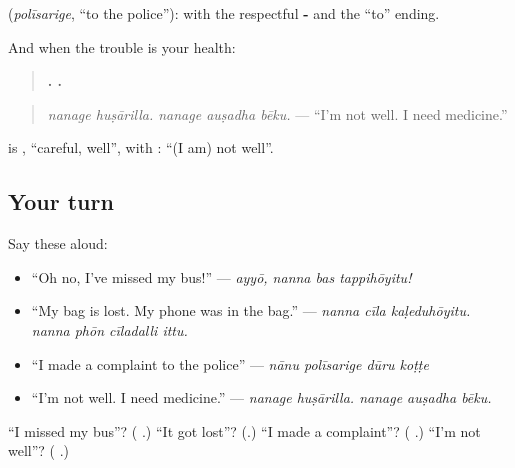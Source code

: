 \textbf{} (\emph{polīsarige}, \textquotedblleft{}to the police\textquotedblright{}): \textbf{} with the respectful \textbf{-} and the \textquotedblleft{}to\textquotedblright{} ending.

And when the trouble is your health:

\begin{quote}
\textbf{ .   .}
\end{quote}

\begin{quote}
\emph{nanage huṣārilla. nanage auṣadha bēku.} — \textquotedblleft{}I'm not well. I need medicine.\textquotedblright{}
\end{quote}

\textbf{} is \textbf{}, \textquotedblleft{}careful, well\textquotedblright{}, with \textbf{}: \textquotedblleft{}(I am) not well\textquotedblright{}.

\subsection*{Your turn}
Say these aloud:

\begin{itemize}
\raggedright
  \item \textquotedblleft{}Oh no, I've missed my bus!\textquotedblright{} — \emph{ayyō, nanna bas tappihōyitu!}
  \item \textquotedblleft{}My bag is lost. My phone was in the bag.\textquotedblright{} — \emph{nanna cīla kaḷeduhōyitu. nanna phōn cīladalli ittu.}
  \item \textquotedblleft{}I made a complaint to the police\textquotedblright{} — \emph{nānu polīsarige dūru koṭṭe}
  \item \textquotedblleft{}I'm not well. I need medicine.\textquotedblright{} — \emph{nanage huṣārilla. nanage auṣadha bēku.}
\end{itemize}

\begin{tcolorbox}[breakable,colback=teal!4,colframe=teal!35!black,title={Before you move on}]
\textquotedblleft{}I missed my bus\textquotedblright{}? (\textbf{  }.) \textquotedblleft{}It got lost\textquotedblright{}? (\textbf{}.) \textquotedblleft{}I made a complaint\textquotedblright{}? (\textbf{ }.) \textquotedblleft{}I'm not well\textquotedblright{}? (\textbf{ }.)
\end{tcolorbox}
